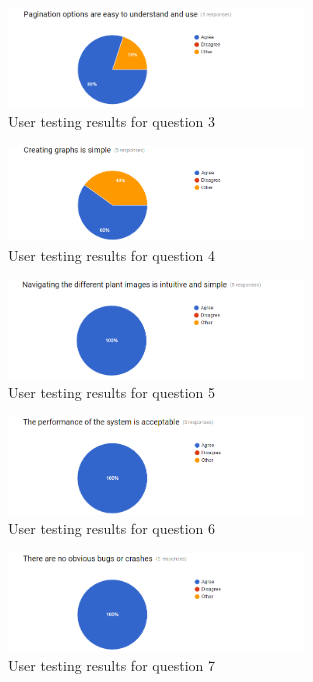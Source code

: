 \begin{figure}[H]
    \centering
    \includegraphics[width=0.7\textwidth]{images/userFeedback/q3}
    \caption{User testing results for question 3}
    \label{fig:jmeter_no_data}
\end{figure} 
\begin{figure}[H]
    \centering
    \includegraphics[width=0.7\textwidth]{images/userFeedback/q4}
    \caption{User testing results for question 4}
    \label{fig:jmeter_no_data}
\end{figure} 
\begin{figure}[H]
    \centering
    \includegraphics[width=0.7\textwidth]{images/userFeedback/q5}
    \caption{User testing results for question 5}
    \label{fig:jmeter_no_data}
\end{figure} 
\begin{figure}[H]
    \centering
    \includegraphics[width=0.7\textwidth]{images/userFeedback/q6}
    \caption{User testing results for question 6}
    \label{fig:jmeter_no_data}
\end{figure} 
\begin{figure}[H]
    \centering
    \includegraphics[width=0.7\textwidth]{images/userFeedback/q7}
    \caption{User testing results for question 7}
    \label{fig:jmeter_no_data}
\end{figure} 
